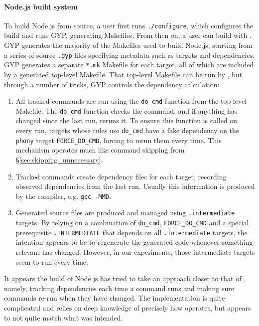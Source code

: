 \paragraph{Node.js build system}

To build Node.js from source, a user first runs \texttt{./configure}, which configures the build and runs GYP, generating Makefiles. From then on, a user can build with \Make. GYP generates the majority of the Makefiles used to build Node.js, starting from a series of source \texttt{.gyp} files specifying metadata such as targets and dependencies. GYP generates a separate \texttt{*.mk} Makefile for each target, all of which are included by a generated top-level Makefile. That top-level Makefile can be run by \Make, but through a number of tricks, GYP  controls  the dependency calculation:

\begin{enumerate}
\item All tracked commands are run using the \texttt{do\_cmd} function from the top-level Makefile. The \texttt{do\_cmd} function checks the command, and if anything has changed since the last run, reruns it. To ensure this function is called on every run, targets whose rules use \texttt{do\_cmd} have a fake dependency on the \texttt{phony} target \texttt{FORCE\_DO\_CMD}, forcing \Make to rerun them every time. This mechanism operates much like \Rattle command skipping from \S\ref{sec:skipping_unnecessary}.
\item Tracked commands create dependency files for each target, recording observed dependencies from the last run. Usually this information is produced by the compiler, e.g. \texttt{gcc -MMD}.
\item Generated source files are produced and managed using \texttt{.intermediate} targets. By relying on a combination of \texttt{do\_cmd}, \texttt{FORCE\_DO\_CMD} and a special prerequisite \texttt{.INTERMEDIATE} that depends on all \texttt{.intermediate} targets, the intention appears to be to regenerate the generated code whenever something relevant has changed. However, in our experiments, those intermediate targets seem to run every time.
\end{enumerate}

It appears the build of Node.js has tried to take an approach closer to that of \Rattle, namely, tracking dependencies each time a command runs and making sure commands re-run when they have changed.  The implementation is quite complicated and relies on deep knowledge of precisely how \Make operates, but appears to not quite match what was intended.


